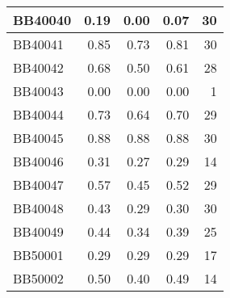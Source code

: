\begin{longtable}{|l|r|r|r||r|}
	\hline
	BB40040 & \cellcolor[rgb]{ .988,  1,  .992}0.19 & \cellcolor[rgb]{ .384,  .745,  .478}0.00 & \cellcolor[rgb]{ .62,  .843,  .678}0.07 & \cellcolor[rgb]{ .973,  .412,  .42}30 \\
	\hline
	BB40041 & \cellcolor[rgb]{ .988,  1,  .992}0.85 & \cellcolor[rgb]{ .384,  .745,  .478}0.73 & \cellcolor[rgb]{ .776,  .91,  .812}0.81 & \cellcolor[rgb]{ .973,  .412,  .42}30 \\
	\hline
	BB40042 & \cellcolor[rgb]{ .988,  1,  .992}0.68 & \cellcolor[rgb]{ .384,  .745,  .478}0.50 & \cellcolor[rgb]{ .773,  .906,  .808}0.61 & \cellcolor[rgb]{ .976,  .451,  .459}28 \\
	\hline
	BB40043 & \cellcolor[rgb]{ .988,  1,  .992}0.00 & \cellcolor[rgb]{ .988,  1,  .992}0.00 & \cellcolor[rgb]{ .988,  1,  .992}0.00 & \cellcolor[rgb]{ .988,  .973,  .984}1 \\
	\hline
	BB40044 & \cellcolor[rgb]{ .988,  1,  .992}0.73 & \cellcolor[rgb]{ .384,  .745,  .478}0.64 & \cellcolor[rgb]{ .776,  .91,  .812}0.70 & \cellcolor[rgb]{ .976,  .431,  .439}29 \\
	\hline
	BB40045 & \cellcolor[rgb]{ .988,  1,  .992}0.88 & \cellcolor[rgb]{ .988,  1,  .992}0.88 & \cellcolor[rgb]{ .988,  1,  .992}0.88 & \cellcolor[rgb]{ .973,  .412,  .42}30 \\
	\hline
	BB40046 & \cellcolor[rgb]{ .988,  1,  .992}0.31 & \cellcolor[rgb]{ .384,  .745,  .478}0.27 & \cellcolor[rgb]{ .769,  .906,  .808}0.29 & \cellcolor[rgb]{ .984,  .722,  .729}14 \\
	\hline
	BB40047 & \cellcolor[rgb]{ .988,  1,  .992}0.57 & \cellcolor[rgb]{ .384,  .745,  .478}0.45 & \cellcolor[rgb]{ .725,  .886,  .769}0.52 & \cellcolor[rgb]{ .976,  .431,  .439}29 \\
	\hline
	BB40048 & \cellcolor[rgb]{ .988,  1,  .992}0.43 & \cellcolor[rgb]{ .384,  .745,  .478}0.29 & \cellcolor[rgb]{ .443,  .769,  .529}0.30 & \cellcolor[rgb]{ .973,  .412,  .42}30 \\
	\hline
	BB40049 & \cellcolor[rgb]{ .988,  1,  .992}0.44 & \cellcolor[rgb]{ .384,  .745,  .478}0.34 & \cellcolor[rgb]{ .702,  .878,  .745}0.39 & \cellcolor[rgb]{ .976,  .51,  .518}25 \\
	\hline
	BB50001 & \cellcolor[rgb]{ .988,  1,  .992}0.29 & \cellcolor[rgb]{ .988,  1,  .992}0.29 & \cellcolor[rgb]{ .988,  1,  .992}0.29 & \cellcolor[rgb]{ .98,  .663,  .675}17 \\
	\hline
	BB50002 & \cellcolor[rgb]{ .988,  1,  .992}0.50 & \cellcolor[rgb]{ .384,  .745,  .478}0.40 & \cellcolor[rgb]{ .941,  .98,  .953}0.49 & \cellcolor[rgb]{ .984,  .722,  .729}14 \\

\end{longtable}

